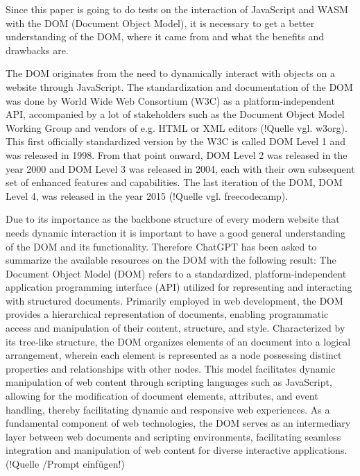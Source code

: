 Since this paper is going to do tests on the interaction of JavaScript and WASM with the DOM (Document Object Model), it is necessary to get a better understanding of the DOM, where it came from and what the benefits and drawbacks are.

The DOM originates from the need to dynamically interact with objects on a website through JavaScript. The standardization and documentation of the DOM was done by World Wide Web Consortium (W3C) as a platform-independent API, accompanied by a lot of stakeholders such as the Document Object Model Working Group and vendors of e.g. HTML or XML editors (!Quelle vgl. w3org). This first officially standardized version by the W3C is called DOM Level 1 and was released in 1998. From that point onward, DOM Level 2 was released in the year 2000 and DOM Level 3 was released in 2004, each with their own subsequent set of enhanced features and capabilities. The last iteration of the DOM, DOM Level 4, was released in the year 2015 (!Quelle vgl. freecodecamp).

Due to its importance as the backbone structure of every modern website that needs dynamic interaction it is important to have a good general understanding of the DOM and its functionality. Therefore ChatGPT has been asked to summarize the available resources on the DOM with the following result: \dq
The Document Object Model (DOM) refers to a standardized, platform-independent application programming interface (API) utilized for representing and interacting with structured documents. Primarily employed in web development, the  DOM provides a hierarchical representation of documents, enabling programmatic access and manipulation of their content, structure, and style. Characterized by its tree-like structure, the DOM organizes elements of an  document into a logical arrangement, wherein each element is represented as a node possessing distinct properties and relationships with other nodes. This model facilitates dynamic manipulation of web content through scripting languages such as JavaScript, allowing for the modification of document elements, attributes, and event handling, thereby facilitating dynamic and responsive web experiences. As a fundamental component of web technologies, the  DOM serves as an intermediary layer between web documents and scripting environments, facilitating seamless integration and manipulation of web content for diverse interactive applications.\dq (!Quelle /Prompt einfügen!)

